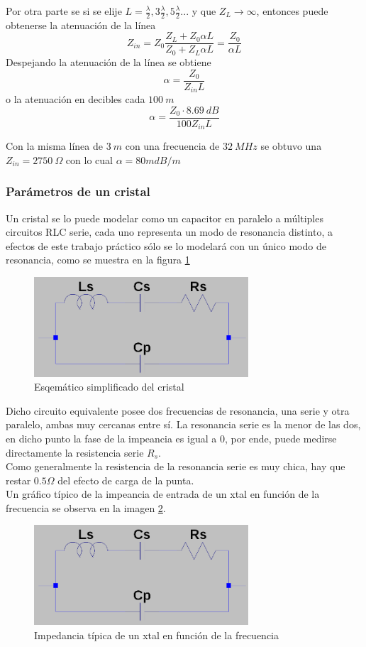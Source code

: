 \documentclass[a4paper,10pt]{article}
\begin{document}
		Por otra parte se si se elije $L=\frac{\lambda}{2},3\frac{\lambda}{2}, 5\frac{\lambda}{2} ...$ y que $Z_L\rightarrow\infty$, entonces puede obtenerse la atenuaci\'on de la l\'inea
		$$Z_{in}=Z_0\frac{Z_L+Z_0\alpha L}{Z_0+Z_L\alpha L}=\frac{Z_0}{\alpha L}$$
		Despejando la atenuaci\'on de la l\'inea se obtiene
		$$\alpha=\frac{Z_0}{Z_{in} L}$$
		o la atenuaci\'on en decibles cada $100~m$
		$$\alpha=\frac{Z_0\cdot8.69~dB}{100Z_{in} L}$$
		
		Con la misma l\'inea de $3~m$ con una frecuencia de $32~MHz$ se obtuvo 
		una $Z_{in}=2750~\Omega$ con lo cual $\alpha=80 mdB/m$
		
		\subsubsection{Par\'ametros de un cristal}	
		\indent Un cristal se lo puede modelar como un capacitor en paralelo a 
		múltiples circuitos RLC serie, cada uno representa un modo de resonancia
		distinto, a efectos de este trabajo práctico sólo se lo modelará con un 
		único modo de resonancia, como se muestra en la figura \ref{img004}

		\begin{figure}[!htb]
			\centering
			\includegraphics[width=8cm]{Imagenes/esqXtal.png}
			\caption{Esqemático simplificado del cristal}
			\label{img004} 
		\end{figure}

		\indent Dicho circuito equivalente posee dos frecuencias de resonancia,
		una serie y otra paralelo, ambas muy cercanas entre sí. La resonancia 
		serie es la menor de las dos, en dicho punto la fase de la impeancia es
		igual a 0, por ende, puede medirse directamente la resistencia serie 
		$R_s$. \\
		\indent Como generalmente la resistencia de la resonancia serie es muy 
		chica, hay que restar $0.5\Omega$ del efecto de carga de la punta. \\
		\indent Un gráfico típico de la impeancia de entrada de un xtal en 
		función de la frecuencia se observa en la imagen \ref{img005}.

		\begin{figure}[!htb]
			\centering
			\includegraphics[width=8cm]{Imagenes/esqXtal.png}
			\caption{Impedancia típica de un xtal en función de la frecuencia}
			\label{img005} 
		\end{figure}
\end{document}
